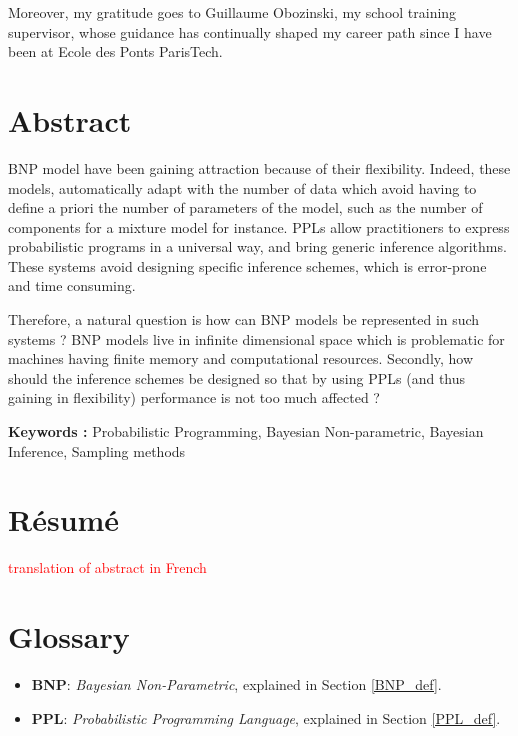 \documentclass[twoside,10pt,openany,a4paper]{rapport}
\begin{document}
Moreover, my gratitude goes to Guillaume Obozinski, my school training supervisor, whose guidance has continually shaped my career path since I have been at Ecole des Ponts ParisTech.

\chapter{Abstract}

\gls{BNP} model have been gaining attraction because of their flexibility. Indeed, these models, automatically adapt with the number of data which avoid having to define a priori the number of parameters of the model, such as the number of components for a mixture model for instance.
\gls{PPLs} allow practitioners to express probabilistic programs in a universal way, and bring generic inference algorithms. These systems avoid designing specific inference schemes, which is error-prone and time consuming.

Therefore, a natural question is how can \gls{BNP} models be represented in such systems ? BNP models live in infinite dimensional space which is problematic for machines having finite memory and computational resources.
Secondly, how should the inference schemes be designed so that by using \gls{PPL}s (and thus gaining in flexibility) performance is not too much affected ?

\textbf{Keywords :} Probabilistic Programming, Bayesian Non-parametric, Bayesian Inference, Sampling methods


\chapter{Résumé}
\textcolor{red}{translation of abstract in French}


\tableofcontents
{}
\listoffigures
{}

\chapter{Glossary}

\begin{itemize} 
\item \textbf{BNP}:  \textit{Bayesian Non-Parametric}, explained in Section \ref{BNP_def}. \\
\item \textbf{PPL}:  \textit{Probabilistic Programming Language}, explained in Section \ref{PPL_def}. \\

\end{itemize}
\end{document}
